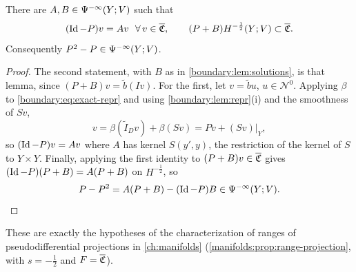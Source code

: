 \begin{lemma}\label{boundary:lem:almost-projection}
There are $A,B\in\Psi^{-\infty}(Y;V)$ such that
\begin{equation*}
(\Id-P)v=Av\ \ \forall\,v\in\overline{\Cau},\qquad (P+B)H^{-\frac12}(Y;V)\subset
\overline{\Cau}.
\end{equation*}
Consequently $P^2-P\in\Psi^{-\infty}(Y;V)$.
\end{lemma}
\begin{proof}
The second statement, with $B$ as in \cref{boundary:lem:solutions}, is that lemma, since
$(P+B)v=\tilde b(Iv)$. For the first, let $v=\tilde bu$, $u\in\mathcal{N}^0$. Applying
$\beta$ to \eqref{boundary:eq:exact-repr} and using \cref{boundary:lem:repr}(i) and the
smoothness of $Sv$,
\begin{equation*}
v=\beta(\tilde I_Dv)+\beta(Sv)=Pv+(Sv)|_Y,
\end{equation*}
so $(\operatorname{Id}-P)v=Av$ where $A$ has kernel $S(y',y)$, the restriction of the kernel of $S$ to
$Y\times Y$. Finally, applying the first identity to $(P+B)v\in\overline{\mathfrak{C}}$ gives
$(\operatorname{Id}-P)(P+B)=A(P+B)$ on $H^{-\frac12}$, so
\begin{equation*}
P-P^2=A(P+B)-(\operatorname{Id}-P)B\in\Psi^{-\infty}(Y;V).\qedhere
\end{equation*}
\end{proof}

These are exactly the hypotheses of the characterization of ranges of
pseudodifferential projections in \cref{ch:manifolds}
(\cref{manifolds:prop:range-projection}, with $s=-\frac12$ and $F=\overline{\mathfrak{C}}$).

